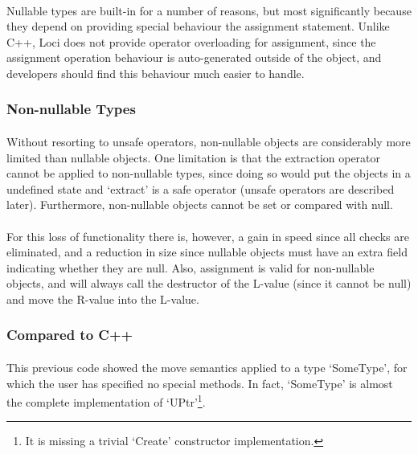 \documentclass[12pt,twoside,notitlepage]{report}
\begin{document}
\paragraph{}
Nullable types are built-in for a number of reasons, but most significantly because they depend on providing special behaviour the assignment statement. Unlike C++, Loci does not provide operator overloading for assignment, since the assignment operation behaviour is auto-generated outside of the object, and developers should find this behaviour much easier to handle.

\subsubsection{Non-nullable Types}

\paragraph{}
Without resorting to unsafe operators, non-nullable objects are considerably more limited than nullable objects. One limitation is that the extraction operator cannot be applied to non-nullable types, since doing so would put the objects in a undefined state and `extract' is a safe operator (unsafe operators are described later). Furthermore, non-nullable objects cannot be set or compared with null.

\paragraph{}
For this loss of functionality there is, however, a gain in speed since all checks are eliminated, and a reduction in size since nullable objects must have an extra field indicating whether they are null. Also, assignment is valid for non-nullable objects, and will always call the destructor of the L-value (since it cannot be null) and move the R-value into the L-value.

\subsubsection{Compared to C++}

\paragraph{}
This previous code showed the move semantics applied to a type `SomeType', for which the user has specified no special methods. In fact, `SomeType' is almost the complete implementation of `UPtr'\footnote{It is missing a trivial `Create' constructor implementation.}.
\end{document}
